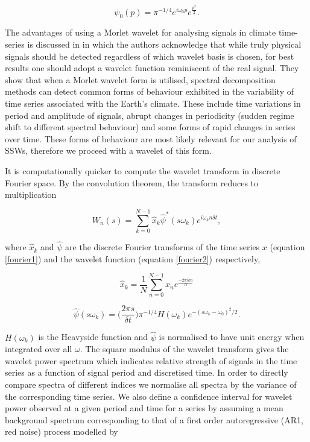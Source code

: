 \begin{equation} \label{psi0}
\psi_0(p) = \pi^{-1/4} e^{i\omega_0 p} e^{\frac{p^2}{2}}.
\end{equation}

The advantages of using a Morlet wavelet for analysing signals in climate time-series is discussed in \cite{Lau1995} in which the authors acknowledge that while truly physical signals should be detected regardless of which wavelet basis is chosen, for best results one should adopt a wavelet function reminiscent of the real signal. They show that when a Morlet wavelet form is utilised, spectral decomposition methods can detect common forms of behaviour exhibited in the variability of time series associated with the Earth's climate. These include time variations in period and amplitude of signals, abrupt changes in periodicity (sudden regime shift to different spectral behaviour) and some forms of rapid changes in series over time. These forms of behaviour are most likely relevant for our analysis of SSWs, therefore we proceed with a wavelet of this form. 

It is computationally quicker to compute the wavelet transform in discrete Fourier space. By the convolution theorem, the transform reduces to multiplication

\begin{equation} \label{wavelet_transform2}
W_n(s) = \sum^{N - 1}_{k = 0} \hat{x}_{k} \hat{\psi}^* (s\omega_k) e^{i \omega_k n \delta t},
\end{equation}

where $\hat{x}_{k}$ and $\hat{\psi}$ are the discrete Fourier transforms of the time series $x$ (equation \ref{fourier1}) and the wavelet function (equation \ref{fourier2}) respectively,

\begin{equation} \label{fourier1}
\hat{x}_k = \frac{1}{N} \sum^{N-1}_{n = 0} x_n e^{\frac{-2\pi i k n}{N}}
\end{equation}

\begin{equation} \label{fourier2}
\hat{\psi}(s\omega_k) = \bigg(\frac{2 \pi s}{\delta t}\bigg) \pi^{-1/4}H(\omega_k) e^{-(s\omega_k - \omega_0)^2/2}.
\end{equation}

$H(\omega_k)$ is the Heavyside function and $\hat{\psi}$ is normalised to have unit energy when integrated over all $\omega$. The square modulus of the wavelet transform gives the wavelet power spectrum which indicates relative strength of signals in the time series as a function of signal period and discretised time. In order to directly compare spectra of different indices we normalise all spectra by the variance of the corresponding time series. We also define a confidence interval for wavelet power observed at a given period and time for a series by assuming a mean background spectrum corresponding to that of a first order autoregressive (AR1, red noise) process modelled by

